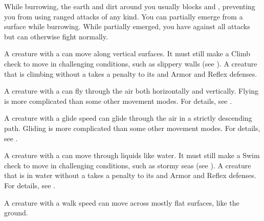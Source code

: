     While burrowing, the earth and dirt around you usually blocks  and , preventing you from using ranged attacks of any kind.
    You can partially emerge from a surface while burrowing.
    While partially emerged, you have  against all attacks but can otherwise fight normally.

    A creature with a  can move along vertical surfaces.
    It must still make a Climb check to move in challenging conditions, such as slippery walls (see ).
    A creature that is climbing without a  takes a  penalty to its  and Armor and Reflex defenses.

    A creature with a  can fly through the air both horizontally and vertically.
    Flying is more complicated than some other movement modes.
    For details, see .

    A creature with a glide speed can glide through the air in a strictly descending path.
    Gliding is more complicated than some other movement modes.
    For details, see .

    A creature with a  can move through liquids like water.
    It must still make a Swim check to move in challenging conditions, such as stormy seas (see ).
    A creature that is in water without a  takes a  penalty to its  and Armor and Reflex defenses.
    For details, see .

    A creature with a walk speed can move across mostly flat surfaces, like the ground.

